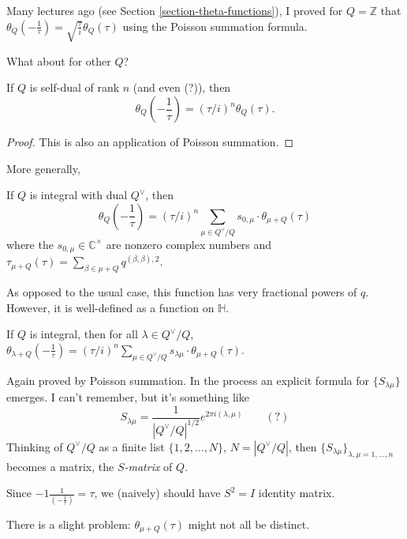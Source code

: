 \medskip\noindent
Many lectures ago
(see Section \ref{section-theta-functions}),
I proved for $Q=\mathbb{Z}$
that $\theta_Q\left(-\frac{1}{\tau}\right)
=\sqrt{\frac{\tau}{i}}\theta_Q(\tau)$
using the Poisson summation formula.

What about for other $Q$?

\begin{proposition}
\label{proposition-theta-funct-self-dual}
If $Q$ is self-dual of rank $n$ (and even
(?)),
then
$$
\theta_Q\left(-\frac{1}{\tau}\right)=
(\tau/i)^n\theta_Q(\tau).
$$
\end{proposition}

\begin{proof}
This is also an application of Poisson
summation.
\end{proof}

\noindent
More generally,

\begin{proposition}
\label{proposition-duplicate-3}
If $Q$ is integral with dual $Q^\vee$,
then
$$
\theta_Q\left(-\frac{1}{\tau}\right)
=(\tau/i)^n \sum_{\mu \in
Q^\vee/Q}s_{0,\mu}\cdot \theta_{\mu+Q}(\tau)
$$
where the $s_{0,\mu} \in \mathbb{C}^\times$
are nonzero complex numbers
and
$\tau_{\mu+Q}(\tau)=\sum_{\beta\in\mu+Q}
q^{(\beta,\beta),2}$.
\end{proposition}

\noindent
As opposed to the usual case, this function
has very
fractional powers of $q$. However, it is
well-defined as
a function on $\mathbb{H}$.

\begin{proposition}
\label{proposition-duplicate-4}
If $Q$ is integral, then for all $\lambda \in
Q^\vee/Q$,
$\theta_{\lambda+Q}\left(-\frac{1}{\tau}
\right)
=(\tau/i)^n \sum_{\mu \in
Q^\vee/Q}s_{\lambda\mu}\cdot\theta_{\mu+Q}
(\tau)$.
\end{proposition}

\noindent
Again proved by Poisson summation.
In the process an explicit formula for
$\{S_{\lambda\mu}\}$ emerges.
I can't remember, but it's something like $$
S_{\lambda\mu}=\frac{1}{|Q^\vee/Q|^{1/2}}
e^{2\pi
i(\lambda,\mu)}
\qquad (?)
$$
Thinking of $Q^\vee/Q$ as a finite list
$\{1,2,\ldots,N\}$, $N=|Q^\vee/Q|$, then
$\{S_{\lambda\mu}\}_{\lambda,\mu=1,\ldots,n}$
becomes a matrix,
the {\it $S$-matrix} of $Q$.

Since
$-1\frac{1}{\left(-\frac{1}{\tau}\right)}=
\tau$,
we (naively) should have $S^2=I$ identity
matrix.

There is a slight problem:
$\theta_{\mu+Q}(\tau)$
might not all be distinct.

